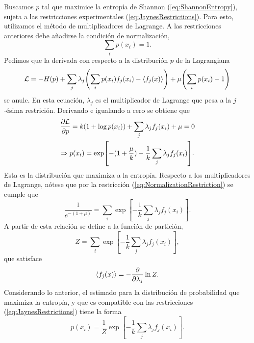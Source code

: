 Buscamos $p$ tal que maximice la entropía de Shannon (\ref{eq:ShannonEntropy}), sujeta a las restricciones experimentales (\ref{eq:JaynesRestrictions}). Para esto, utilizamos el método de multiplicadores de Lagrange. A las restricciones anteriores debe añadirse la condición de normalización, 
\begin{equation}\label{eq:NormalizationRestriction}
    \sum_{i}p(x_{i})=1.
\end{equation}
Pedimos que la derivada con respecto a la distribución $p$  de la Lagrangiana
\begin{equation}
    \mathcal{L}=-H(p)+\sum_{j}\lambda_{j}\qty(\sum_{i}p(x_{i})f_{j}(x_{i})-\expval{f_{j}(x)})+\mu\qty(\sum_{i}p(x_{i})-1)\nonumber
\end{equation}
se anule. En esta ecuación, $\lambda_{j}$ es el multiplicador de Lagrange que pesa a la $j$-ésima restrición. Derivando e igualando a cero se obtiene que
\begin{gather*}
    \frac{\partial \mathcal{L}}{\partial p}=k(1+\log{p(x_{i})})+\sum_{j}\lambda_{j}f_{j}(x_{i})+\mu=0\\
    \Rightarrow p(x_{i})=\exp[-(1+\frac{\mu}{k})-\frac{1}{k}\sum_{j}\lambda_{j}f_{j}(x_{i})].
\end{gather*}
Esta es la distribución que maximiza a la entropía. Respecto a los multiplicadores de Lagrange, nótese que por la restricción (\ref{eq:NormalizationRestriction}) se cumple que
\begin{equation*}
    \frac{1}{e^{-(1+\mu)}}=\sum_{i}\exp[-\frac{1}{k}\sum_{j}\lambda_{j}f_{j}(x_{i})].
\end{equation*}
A partir de esta relación se define a la función de partición,
\begin{equation*}
    Z=\sum_{i}\exp[-\frac{1}{k}\sum_{j}\lambda_{j}f_{j}(x_{i})],
\end{equation*}
que satisface
\begin{equation*}
    \expval{f_{j}(x)}=-\frac{\partial}{\partial \lambda_{j}}\ln{Z}.
\end{equation*}
Considerando lo anterior, el estimado para la distribución de probabilidad que maximiza la entropía, y que es compatible con las restricciones (\ref{eq:JaynesRestrictions}) tiene la forma 
\begin{equation}\label{eq:MaxEntDist}
    p(x_{i})=\frac{1}{Z}\exp[-\frac{1}{k}\sum_{j}\lambda_{j}f_{j}(x_{i})].
\end{equation}


